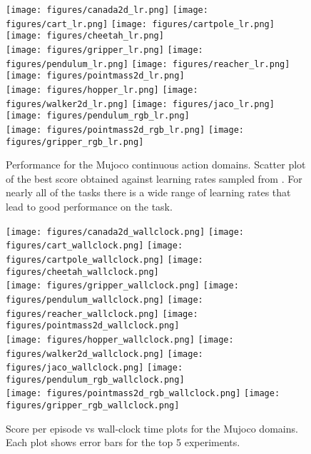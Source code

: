 \documentclass{article} \usepackage{times}
\begin{document}
\begin{figure}[t]
    \texttt{[image: figures/canada2d\_lr.png]}
    \texttt{[image: figures/cart\_lr.png]}
    \texttt{[image: figures/cartpole\_lr.png]}
    \texttt{[image: figures/cheetah\_lr.png]}\\
    \texttt{[image: figures/gripper\_lr.png]}
    \texttt{[image: figures/pendulum\_lr.png]}
    \texttt{[image: figures/reacher\_lr.png]}
    \texttt{[image: figures/pointmass2d\_lr.png]}\\
    \texttt{[image: figures/hopper\_lr.png]}
    \texttt{[image: figures/walker2d\_lr.png]}
    \texttt{[image: figures/jaco\_lr.png]}
    \texttt{[image: figures/pendulum\_rgb\_lr.png]}\\
    \texttt{[image: figures/pointmass2d\_rgb\_lr.png]}
    \texttt{[image: figures/gripper\_rgb\_lr.png]}
    \caption{\label{fig-mujoco-lr} Performance for the Mujoco continuous action domains.
        Scatter plot of the best score obtained against learning rates
        sampled from .  For nearly all of the tasks
    there is a wide range of learning rates that lead to good performance on the task.}
\end{figure}



\begin{figure}[t]
    \texttt{[image: figures/canada2d\_wallclock.png]}
    \texttt{[image: figures/cart\_wallclock.png]}
    \texttt{[image: figures/cartpole\_wallclock.png]}
    \texttt{[image: figures/cheetah\_wallclock.png]}\\
    \texttt{[image: figures/gripper\_wallclock.png]}
    \texttt{[image: figures/pendulum\_wallclock.png]}
    \texttt{[image: figures/reacher\_wallclock.png]}
    \texttt{[image: figures/pointmass2d\_wallclock.png]}\\
    \texttt{[image: figures/hopper\_wallclock.png]}
    \texttt{[image: figures/walker2d\_wallclock.png]}
    \texttt{[image: figures/jaco\_wallclock.png]}
    \texttt{[image: figures/pendulum\_rgb\_wallclock.png]}\\
    \texttt{[image: figures/pointmass2d\_rgb\_wallclock.png]}
    \texttt{[image: figures/gripper\_rgb\_wallclock.png]}
    \caption{\label{fig-mujoco-wallclock} Score per episode vs wall-clock time
    plots for the Mujoco domains. Each plot shows error bars for the top 5 experiments.}
\end{figure}
\end{document}
